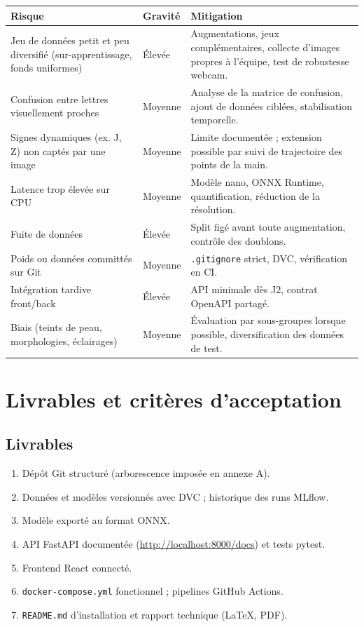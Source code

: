 \documentclass[11pt,a4paper]{article}
\begin{document}
\begin{longtable}{@{}p{4.3cm}p{1.8cm}p{6.6cm}@{}}
\toprule
\textbf{Risque} & \textbf{Gravité} & \textbf{Mitigation} \\ \midrule
\endhead
Jeu de données petit et peu diversifié (sur-apprentissage, fonds uniformes) & Élevée & Augmentations, jeux complémentaires, collecte d'images propres à l'équipe, test de robustesse webcam. \\
Confusion entre lettres visuellement proches & Moyenne & Analyse de la matrice de confusion, ajout de données ciblées, stabilisation temporelle. \\
Signes dynamiques (ex. J, Z) non captés par une image & Moyenne & Limite documentée ; extension possible par suivi de trajectoire des points de la main. \\
Latence trop élevée sur CPU & Moyenne & Modèle nano, ONNX Runtime, quantification, réduction de la résolution. \\
Fuite de données & Élevée & Split figé avant toute augmentation, contrôle des doublons. \\
Poids ou données committés sur Git & Moyenne & \texttt{.gitignore} strict, DVC, vérification en CI. \\
Intégration tardive front/back & Élevée & API minimale dès J2, contrat OpenAPI partagé. \\
Biais (teints de peau, morphologies, éclairages) & Moyenne & Évaluation par sous-groupes lorsque possible, diversification des données de test. \\ \bottomrule
\end{longtable}

\section{Livrables et critères d'acceptation}

\subsection{Livrables}
\begin{enumerate}[leftmargin=*]
  \item Dépôt Git structuré (arborescence imposée en annexe A).
  \item Données et modèles versionnés avec DVC ; historique des runs MLflow.
  \item Modèle exporté au format ONNX.
  \item API FastAPI documentée (\url{http://localhost:8000/docs}) et tests pytest.
  \item Frontend React connecté.
  \item \texttt{docker-compose.yml} fonctionnel ; pipelines GitHub Actions.
  \item \texttt{README.md} d'installation et rapport technique (LaTeX, PDF).
\end{enumerate}
\end{document}

